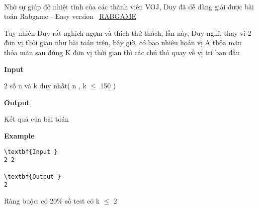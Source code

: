 

 

Nhờ sự giúp đỡ nhiệt tình của các thành viên VOJ, Duy đã dễ dàng giải được bài toán Rabgame - Easy version  \href{http://vnoi.info/problems/show/RABGAME/}{RABGAME}

Tuy nhiên Duy rất nghịch ngợm và thích thử thách, lần này, Duy nghĩ, thay vì 2 đơn vị thời gian như bài toán trên, bây giờ, có bao nhiêu hoán vị A thỏa mãn thỏa mãn sau đúng K đơn vị thời gian thì các chú thỏ quay về vị trí ban đầu

\textbf{Input }

2 số n và k duy nhất( n , k  $\le$  150 )

\textbf{Output }

Kết quả của bài toán

\textbf{Example }
\begin{verbatim}
\textbf{Input }
2 2

\textbf{Output }
2\end{verbatim}

Ràng buộc: có 20\% số test có k  $\le$  2
